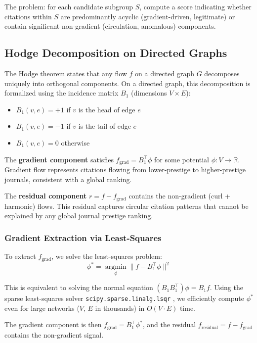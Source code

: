 \documentclass[11pt,letterpaper]{article}
\begin{document}
The problem: for each candidate subgroup $S$, compute a score indicating whether citations within $S$ are predominantly acyclic (gradient-driven, legitimate) or contain significant non-gradient (circulation, anomalous) components.

\subsection{Hodge Decomposition on Directed Graphs}

The Hodge theorem states that any flow $f$ on a directed graph $G$ decomposes uniquely into orthogonal components. On a directed graph, this decomposition is formalized using the incidence matrix $B_1$ (dimensions $V \times E$):
\begin{itemize}
  \item $B_1(v, e) = +1$ if $v$ is the head of edge $e$
  \item $B_1(v, e) = -1$ if $v$ is the tail of edge $e$
  \item $B_1(v, e) = 0$ otherwise
\end{itemize}

The \textbf{gradient component} satisfies $f_{\mathrm{grad}} = B_1^\top \phi$ for some potential $\phi : V \to \mathbb{R}$. Gradient flow represents citations flowing from lower-prestige to higher-prestige journals, consistent with a global ranking.

The \textbf{residual component} $r = f - f_{\mathrm{grad}}$ contains the non-gradient (curl + harmonic) flows. This residual captures circular citation patterns that cannot be explained by any global journal prestige ranking.

\subsubsection*{Gradient Extraction via Least-Squares}

To extract $f_{\mathrm{grad}}$, we solve the least-squares problem:
\[
  \phi^* = \operatorname*{argmin}_\phi \|f - B_1^\top \phi\|^2
\]

This is equivalent to solving the normal equation $(B_1 B_1^\top)\phi = B_1 f$. Using the sparse least-squares solver \texttt{scipy.sparse.linalg.lsqr} \citep{SciPy2024}, we efficiently compute $\phi^*$ even for large networks ($V$, $E$ in thousands) in $O(V \cdot E)$ time.

The gradient component is then $f_{\mathrm{grad}} = B_1^\top \phi^*$, and the residual $f_{\mathrm{residual}} = f - f_{\mathrm{grad}}$ contains the non-gradient signal.
\end{document}
